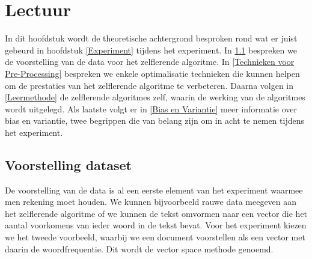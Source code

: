 \chapter{Lectuur}\label{Lectuur}

In dit hoofdstuk wordt de theoretische achtergrond besproken rond wat er juist gebeurd in hoofdstuk \ref{Experiment} tijdens het experiment. In \ref{Voorstelling dataset} bespreken we de voorstelling van de data voor het zelflerende algoritme. In \ref{Technieken voor Pre-Processing} bespreken we enkele optimalisatie technieken die kunnen helpen om de prestaties van het zelflerende algoritme te verbeteren. Daarna volgen in \ref{Leermethode} de zelflerende algoritmes zelf, waarin de werking van de algoritmes wordt uitgelegd. Als laatste volgt er in \ref{Bias en Variantie} meer informatie over bias en variantie, twee begrippen die van belang zijn om in acht te nemen tijdens het experiment.

\section{Voorstelling dataset}\label{Voorstelling dataset}
%
De voorstelling van de data is al een eerste element van  het experiment waarmee men rekening moet houden. We kunnen bijvoorbeeld rauwe data meegeven aan het zelflerende algoritme of we kunnen de tekst omvormen naar een vector die het aantal voorkomens van ieder woord in de tekst bevat. Voor het experiment kiezen we het tweede voorbeeld, waarbij we een document voorstellen als een vector met daarin de woordfrequentie. Dit wordt de vector space methode genoemd.

